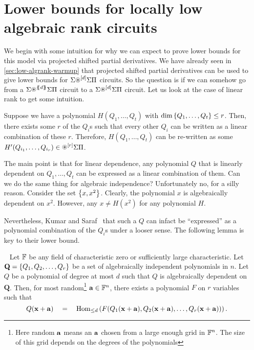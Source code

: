 \section{Lower bounds for locally low algebraic rank circuits}

We begin with some intuition for why we can expect to prove lower bounds for this model via projected shifted partial derivatives.
We have already seen in \autoref{sec:low-algrank-warmup} that projected shifted partial derivatives can be used to give lower bounds for $\Sigma\circast^{[d]}\Sigma\Pi$ circuits.
So the question is if we can somehow go from a $\SASP{d}$ circuit to a $\Sigma\circast^{[d]}\Sigma\Pi$ circuit.
Let us look at the case of linear rank to get some intuition.

Suppose we have a polynomial $H(Q_1,\ldots, Q_t)$ with $\dim \left\{Q_1,\ldots, Q_t\right\} \leq r$.
Then, there exists some $r$ of the $Q_i$s such that every other $Q_i$ can be written as a linear combination of these $r$.
Therefore, $H(Q_1,\ldots, Q_t)$ can be re-written as some $H'(Q_{i_1}, \ldots, Q_{i_r}) \in \circast^{[r]}\Sigma\Pi$.

The main point is that for linear dependence, any polynomial $Q$ that is linearly dependent on $Q_1,\ldots, Q_t$ can be expressed as a linear combination of them.
Can we do the same thing for algebraic independence?
Unfortunately no, for a silly reason.
Consider the set $\left\{x,x^2\right\}$.
Clearly, the polynomial $x$ is algebraically dependent on $x^2$.
However, any $x \neq H(x^2)$ for any polynomial $H$.

Nevertheless, Kumar and Saraf~\cite{KS16lowrank} that such a $Q$ can infact be ``expressed'' as a polynomial combination of the $Q_i$s under a looser sense.
The following lemma is key to their lower bound.

\begin{lemma}~\label{lem:alg-dep-to-func-dep-tail} Let $\mathbb{F}$ be any field of characteristic zero or sufficiently large characteristic.
Let $\mathbf{Q} = \left\{Q_1, Q_2, \ldots, Q_r\right\}$ be a set of algebraically independent polynomials in $n$.
Let $Q$ be a polynomial of degree at most $d$ such that $Q$ is algebraically dependent on $\mathbf{Q}$.
Then, for most random\footnote{Here random $\mathbf{a}$ means an $\mathbf{a}$ chosen from a large enough grid in $\mathbb{F}^n$.
The size of this grid depends on the degrees of the polynomials} $\mathbf{a} \in \mathbb{F}^{n}$, there exists a polynomial $F$ on $r$ variables such that
\[
Q(\mathbf{x} + \mathbf{a}) \quad = \quad \operatorname{Hom}_{\leq d}\left(F(Q_1(\mathbf{x} + \mathbf{a}), Q_2(\mathbf{x} + \mathbf{a}), \ldots, Q_r(\mathbf{x} + \mathbf{a}))\right).
\]
\end{lemma}

